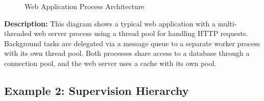 \documentclass[11pt,letterpaper]{article}
\begin{document}
\begin{figure}[H]
\caption{Web Application Process Architecture}
\end{figure}

\textbf{Description:} This diagram shows a typical web application with a multi-threaded web server process using a thread pool for handling HTTP requests. Background tasks are delegated via a message queue to a separate worker process with its own thread pool. Both processes share access to a database through a connection pool, and the web server uses a cache with its own pool.

\subsection{Example 2: Supervision Hierarchy}
\end{document}
